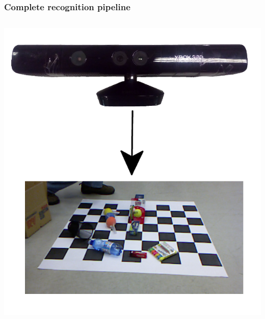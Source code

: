 \documentclass{beamer}
\begin{document}
  \begin{frame}
    \frametitle{Complete recognition pipeline}
    \begin{columns}
      \includegraphics[width=\textwidth]{kinect}



\end{columns}
\end{frame}
\end{document}

